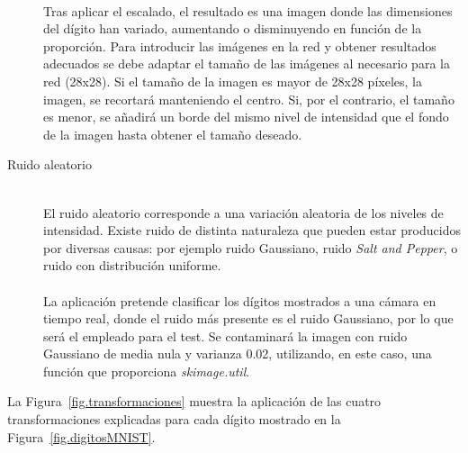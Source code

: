 \begin{description}
	\vspace{-10pt}
	\\
	Tras aplicar el escalado, el resultado es una imagen donde las dimensiones del dígito han variado, aumentando o disminuyendo en función de la proporción. Para introducir las imágenes en la red y obtener resultados adecuados se debe adaptar el tamaño de las imágenes al necesario para la red (28x28). Si el tamaño de la imagen es mayor de 28x28 píxeles, la imagen, se recortará manteniendo el centro. Si, por el contrario, el tamaño es menor, se añadirá un borde del mismo nivel de intensidad que el fondo de la imagen hasta obtener el tamaño deseado.
	\vspace{10pt}
	\item[Ruido aleatorio] \hfill 
	\vspace{10pt}
	\\
	El ruido aleatorio corresponde a una variación aleatoria de los niveles de intensidad. Existe ruido de distinta naturaleza que pueden estar producidos por diversas causas: por ejemplo ruido Gaussiano, ruido \textit{Salt and Pepper}, o ruido con distribución uniforme.\\
	\vspace{-10pt}
	\\
	La aplicación pretende clasificar los dígitos mostrados a una cámara en tiempo real, donde el ruido más presente es el ruido Gaussiano, por lo que será el empleado para el test. Se contaminará la imagen con ruido Gaussiano de media nula y varianza 0.02, utilizando, en este caso, una función que proporciona \textit{skimage.util}. 
\end{description}

La Figura~\ref{fig.transformaciones} muestra la aplicación de las cuatro transformaciones explicadas para cada dígito mostrado en la Figura~\ref{fig.digitosMNIST}.

